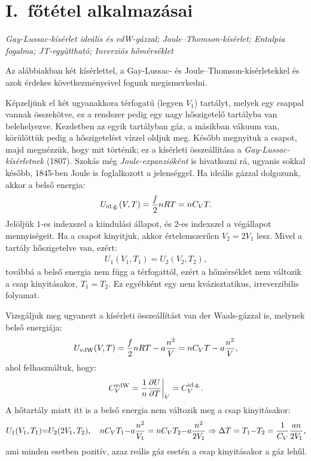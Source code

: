 \section{I.\ főtétel alkalmazásai}
\emph{Gay-Lussac-kísérlet ideális és vdW-gázzal; Joule--Thomson-kísérlet; Entalpia fogalma; JT-együttható; Inverziós hőmérséklet}

Az alábbiakban két kísérlettel, a Gay-Lussac- és Joule--Thomson-kísérletekkel és azok érdekes következményeivel fogunk megismerkedni.
 
Képzeljünk el két ugyanakkora térfogatú (legyen $V_1$) tartályt, melyek egy csappal vannak összekötve, ez a rendszer pedig egy nagy hőszigetelő tartályba van belehelyezve. Kezdetben az egyik tartályban gáz, a másikban vákuum van, körülöttük pedig a hőszigetelést vízzel oldjuk meg. Később megnyituk a csapot, majd megnézzük, hogy mit történik; ez a kísérleti összeállítása a \emph{Gay-Lussac-kísérletnek} (1807). Szokás még \emph{Joule-expanzióként} is hivatkozni rá, ugyanis sokkal később, 1845-ben Joule is foglalkozott a jelenséggel. Ha ideális gázzal dolgozunk, akkor a belső energia:
\begin{align}
    U_{\textnormal{id.g.}}(V,T) = \frac f2 nRT = nC_VT.
\end{align}
Jelöljük $1$-es indexszel a kiindulási állapot, és $2$-es indexszel a végállapot mennyiségeit. Ha a csapot kinyitjuk, akkor értelemszerűen $V_2 = 2V_1$ lesz. Mivel a tartály hőszigetelve van, ezért:
\begin{align}
    U_1(V_1,T_1) = U_2(V_2,T_2),
\end{align}
továbbá a belső energia nem függ a térfogattól, ezért a hőmérséklet nem változik a csap kinyitásakor, $T_1=T_2$. Ez egyébként egy nem kvázisztatikus, irreverzibilis folyamat.

Vizsgáljuk meg ugyanezt a kísérleti összeállítást van der Waals-gázzal is, melynek belső energiája:
\begin{align}
    U_{\textnormal{vdW}}(V,T) = \frac f2 nRT - a\frac{n^2}{V} = nC_VT-a\frac{n^2}{V},
\end{align}
ahol felhasználtuk, hogy:
\begin{align}
    C_V^{\textnormal{vdW}} = \frac{1}{n}\frac{\partial{U}}{\partial{T}}\bigg|_V = C_V^{\textnormal{id.g.}}.
\end{align}
A hőtartály miatt itt is a belső energia nem változik meg a csap kinyitásakor:
\begin{align}
    U_1(V_1,T_1){=}U_2(2V_1,T_2),\quad nC_VT_1 {-} a\frac{n^2}{V_1} = nC_VT_2{-}a\frac{n^2}{2V_1}\Rightarrow \Delta T=T_1{-}T_2 = \frac{1}{C_V} \frac{an}{2V_1},
\end{align}
ami minden esetben pozitív, azaz reális gáz esetén a csap kinyitásakor a gáz lehűl.


